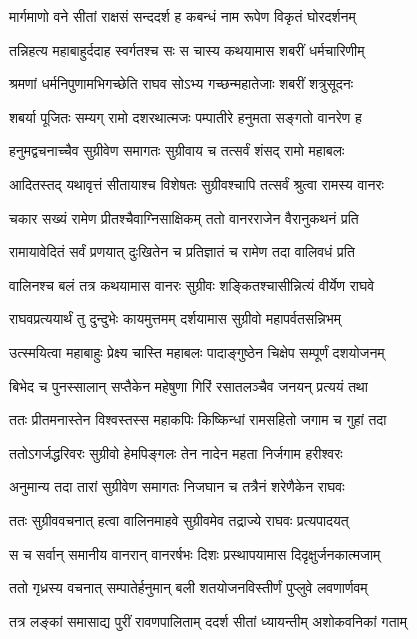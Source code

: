 \twolineshloka
{मार्गमाणो वने सीतां राक्षसं सन्ददर्श ह}
{कबन्धं नाम रूपेण विकृतं घोरदर्शनम्} %

\twolineshloka
{तन्निहत्य महाबाहुर्ददाह स्वर्गतश्च सः}
{स चास्य कथयामास शबरीं धर्मचारिणीम्} %

\twolineshloka
{श्रमणां धर्मनिपुणामभिगच्छेति राघव}
{सोऽभ्य गच्छन्महातेजाः शबरीं शत्रुसूदनः} %

\twolineshloka
{शबर्या पूजितः सम्यग् रामो दशरथात्मजः}
{पम्पातीरे हनुमता सङ्गतो वानरेण ह} %

\twolineshloka
{हनुमद्वचनाच्चैव सुग्रीवेण समागतः}
{सुग्रीवाय च तत्सर्वं शंसद् रामो महाबलः} %

\twolineshloka
{आदितस्तद् यथावृत्तं सीतायाश्च विशेषतः}
{सुग्रीवश्चापि तत्सर्वं श्रुत्वा रामस्य वानरः} %

\twolineshloka
{चकार सख्यं रामेण प्रीतश्चैवाग्निसाक्षिकम्}
{ततो वानरराजेन वैरानुकथनं प्रति} %

\twolineshloka
{रामायावेदितं सर्वं प्रणयात् दुःखितेन च}
{प्रतिज्ञातं च रामेण तदा वालिवधं प्रति} %

\twolineshloka
{वालिनश्च बलं तत्र कथयामास वानरः}
{सुग्रीवः शङ्कितश्चासीन्नित्यं वीर्येण राघवे} %

\twolineshloka
{राघवप्रत्ययार्थं तु दुन्दुभेः कायमुत्तमम्}
{दर्शयामास सुग्रीवो महापर्वतसन्निभम्} %

\twolineshloka
{उत्स्मयित्वा महाबाहुः प्रेक्ष्य चास्ति महाबलः}
{पादाङ्गुष्ठेन चिक्षेप सम्पूर्णं दशयोजनम्} %

\twolineshloka
{बिभेद च पुनस्सालान् सप्तैकेन महेषुणा}
{गिरिं रसातलञ्चैव जनयन् प्रत्ययं तथा} %

\twolineshloka
{ततः प्रीतमनास्तेन विश्वस्तस्स महाकपिः}
{किष्किन्धां रामसहितो जगाम च गुहां तदा} %

\twolineshloka
{ततोऽगर्जद्धरिवरः सुग्रीवो हेमपिङ्गलः}
{तेन नादेन महता निर्जगाम हरीश्वरः} %

\twolineshloka
{अनुमान्य तदा तारां सुग्रीवेण समागतः}
{निजघान च तत्रैनं शरेणैकेन राघवः} %

\twolineshloka
{ततः सुग्रीववचनात् हत्वा वालिनमाहवे}
{सुग्रीवमेव तद्राज्ये राघवः प्रत्यपादयत्} %

\twolineshloka
{स च सर्वान् समानीय वानरान् वानरर्षभः}
{दिशः प्रस्थापयामास दिदृक्षुर्जनकात्मजाम्} %

\twolineshloka
{ततो गृध्रस्य वचनात् सम्पातेर्हनुमान् बली}
{शतयोजनविस्तीर्णं पुप्लुवे लवणार्णवम्} %

\twolineshloka
{तत्र लङ्कां समासाद्य पुरीं रावणपालिताम्}
{ददर्श सीतां ध्यायन्तीम् अशोकवनिकां गताम्} %


